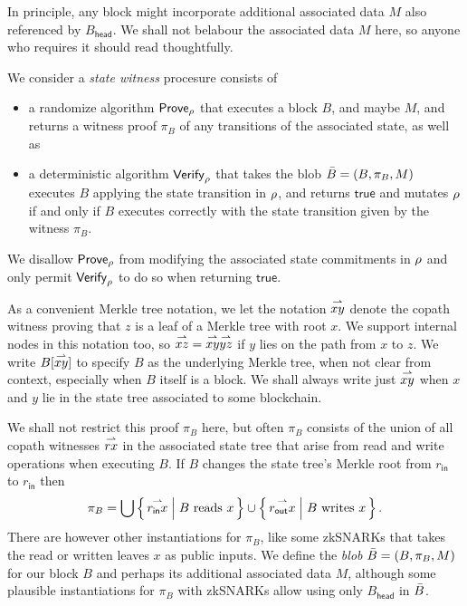 In principle, any block might incorporate additional associated data $M$ also referenced by $B_{\mathsf{head}}$.  We shall not belabour the associated data $M$ here, so anyone who requires it should read thoughtfully.

\begin{definition}\label{def:pob}
We consider a {\em state witness} procesure consists of  
\begin{itemize}
\item a randomize algorithm $\mathsf{Prove}_{\rho}$ that executes a block $B$, and maybe $M$, and returns a witness proof $\pi_B$ of any transitions of the associated state, as well as 
\item a deterministic algorithm $\mathsf{Verify}_{\rho}$ that takes the blob $\bar{B} = (B,\pi_B,M)$ executes $B$ applying the state transition in $\rho$, and returns $\mathsf{true}$ and mutates $\rho$ if and only if $B$ executes correctly with the state transition given by the witness $\pi_B$.  
\end{itemize}
\end{definition}
We disallow $\mathsf{Prove}_{\rho}$ from modifying the associated state commitments in $\rho$ and only permit $\mathsf{Verify}_{\rho}$ to do so when returning $\mathsf{true}$.

As a convenient Merkle tree notation, we let the notation $\overset{\rightharpoonup}{xy}$ denote the copath witness proving that $z$ is a leaf of a Merkle tree with root $x$.  We support internal nodes in this notation too, so $\overset{\rightharpoonup}{xz} = \overset{\rightharpoonup}{xy} \overset{\rightharpoonup}{yz}$ if $y$ lies on the path from $x$ to $z$.  We write $B[\overset{\rightharpoonup}{xy}]$ to specify $B$ as the underlying Merkle tree, when not clear from context, especially when $B$ itself is a block.  We shall always write just $\overset{\rightharpoonup}{xy}$ when $x$ and $y$ lie in the state tree associated to some blockchain.  

We shall not restrict this proof $\pi_B$ here, but often $\pi_B$ consists of the union of all copath witnesses $\overset{\rightharpoonup}{rx}$ in the associated state tree that arise from read and write operations when executing $B$.  If $B$ changes the state tree's Merkle root from $r_{\mathsf{in}}$ to $r_{\mathsf{in}}$ then 
$$
\pi_B = 
  \bigcup \Setst{ \vect{r_{\mathsf{in}}x} }{ \textrm{$B$ reads $x$} }
  \cup \Setst{ \vect{r_{\mathsf{out}}x} }{ \textrm{$B$ writes $x$} } \mathperiod
$$
There are however other instantiations for $\pi_B$, like some zkSNARKs that takes the read or written leaves $x$ as public inputs.  We define the {\em blob} $\bar{B} = (B, \pi_B, M)$ for our block $B$ and perhaps its additional associated data $M$, although some plausible instantiations for $\pi_B$ with zkSNARKs allow using only $B_{\mathsf{head}}$ in $\bar{B}$.

